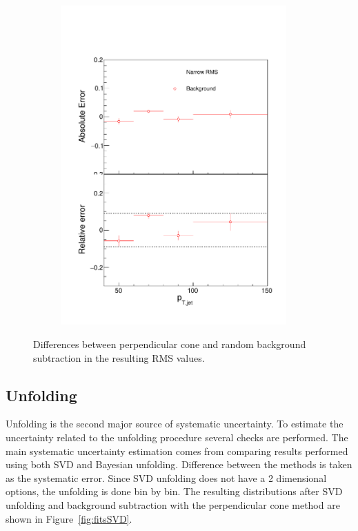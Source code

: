 \begin{figure}
\begin{subfigure}{0.24\textwidth}
\includegraphics[width=0.95\textwidth]{results/SystematicErrors/SystematicErrorsGausRMS_BgNFin00JetPt08_linx_data}
\end{subfigure}
\caption{Differences between perpendicular cone and random background subtraction in the resulting RMS values.}
\label{fig:systbg}
\end{figure}

  
  
  
  \subsection{Unfolding}
Unfolding is the second major source of systematic uncertainty. To estimate the uncertainty related to the unfolding procedure several checks are performed. The main systematic uncertainty estimation comes from comparing results performed using both SVD and Bayesian unfolding. Difference between the methods is taken as the systematic error. Since SVD unfolding does not have a 2 dimensional options, the unfolding is done bin by bin. The resulting distributions after SVD unfolding and background subtraction with the perpendicular cone method are shown in Figure~\ref{fig:fitsSVD}. 

